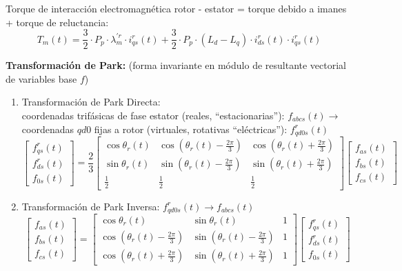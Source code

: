 \documentclass[11pt,a4paper]{article}
\begin{document}
Torque de interacción electromagnética rotor - estator = torque debido a imanes + torque de reluctancia:
\begin{equation}
T_{m}(t) = \frac{3}{2} \cdot P_p \cdot \lambda_{m}^{\prime r} \cdot i_{qs}^{r}(t) + \frac{3}{2} \cdot P_p \cdot (L_d - L_q) \cdot i_{ds}^{r}(t) \cdot i_{qs}^{r}(t) \tag{Ec. 3.5}
\end{equation}

\textbf{Transformación de Park:} (forma invariante en módulo de resultante vectorial de variables base $f$)
\begin{enumerate}[label=\alph*)]
    \item Transformación de Park Directa:\\
    coordenadas trifásicas de fase estator (reales, ``estacionarias''): $f_{abcs}(t) \rightarrow$ coordenadas $qd0$ fijas a rotor (virtuales, rotativas ``eléctricas''): $f_{qd0s}^{r}(t)$
    \begin{equation*}
    \begin{bmatrix}
    f_{qs}^r(t) \\
    f_{ds}^r(t) \\
    f_{0s}(t)
    \end{bmatrix}
    = \frac{2}{3}
    \begin{bmatrix}
    \cos\theta_r(t) & \cos(\theta_r(t)-\frac{2\pi}{3}) & \cos(\theta_r(t)+\frac{2\pi}{3}) \\
    \sin\theta_r(t) & \sin(\theta_r(t)-\frac{2\pi}{3}) & \sin(\theta_r(t)+\frac{2\pi}{3}) \\
    \frac{1}{2} & \frac{1}{2} & \frac{1}{2}
    \end{bmatrix}
    \begin{bmatrix}
    f_{as}(t) \\
    f_{bs}(t) \\
    f_{cs}(t)
    \end{bmatrix}
    \end{equation*}

    \item Transformación de Park Inversa: $f_{qd0s}^{r}(t) \rightarrow f_{abcs}(t)$
    \begin{equation*}
    \begin{bmatrix}
    f_{as}(t) \\
    f_{bs}(t) \\
    f_{cs}(t)
    \end{bmatrix}
    =
    \begin{bmatrix}
    \cos\theta_r(t) & \sin\theta_r(t) & 1 \\
    \cos(\theta_r(t)-\frac{2\pi}{3}) & \sin(\theta_r(t)-\frac{2\pi}{3}) & 1 \\
    \cos(\theta_r(t)+\frac{2\pi}{3}) & \sin(\theta_r(t)+\frac{2\pi}{3}) & 1
    \end{bmatrix}
    \begin{bmatrix}
    f_{qs}^r(t) \\
    f_{ds}^r(t) \\
    f_{0s}(t)
    \end{bmatrix}
    \end{equation*}
\end{enumerate}
\end{document}
